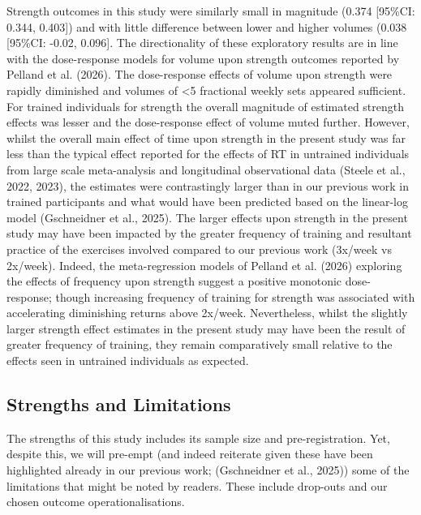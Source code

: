 \documentclass[
]{article}
\begin{document}
Strength outcomes in this study were similarly small in magnitude (0.374
{[}95\%CI: 0.344, 0.403{]}) and with little difference between lower and
higher volumes (0.038 {[}95\%CI: -0.02, 0.096{]}. The directionality of
these exploratory results are in line with the dose-response models for
volume upon strength outcomes reported by Pelland et al. (2026). The
dose-response effects of volume upon strength were rapidly diminished
and volumes of \textless5 fractional weekly sets appeared sufficient.
For trained individuals for strength the overall magnitude of estimated
strength effects was lesser and the dose-response effect of volume muted
further. However, whilst the overall main effect of time upon strength
in the present study was far less than the typical effect reported for
the effects of RT in untrained individuals from large scale
meta-analysis and longitudinal observational data (Steele et al., 2022,
2023), the estimates were contrastingly larger than in our previous work
in trained participants and what would have been predicted based on the
linear-log model (Gschneidner et al., 2025). The larger effects upon
strength in the present study may have been impacted by the greater
frequency of training and resultant practice of the exercises involved
compared to our previous work (3x/week vs 2x/week). Indeed, the
meta-regression models of Pelland et al. (2026) exploring the effects of
frequency upon strength suggest a positive monotonic dose-response;
though increasing frequency of training for strength was associated with
accelerating diminishing returns above 2x/week. Nevertheless, whilst the
slightly larger strength effect estimates in the present study may have
been the result of greater frequency of training, they remain
comparatively small relative to the effects seen in untrained
individuals as expected.

\subsection{Strengths and Limitations}\label{strengths-and-limitations}

The strengths of this study includes its sample size and
pre-registration. Yet, despite this, we will pre-empt (and indeed
reiterate given these have been highlighted already in our previous
work; (Gschneidner et al., 2025)) some of the limitations that might be
noted by readers. These include drop-outs and our chosen outcome
operationalisations.
\end{document}
